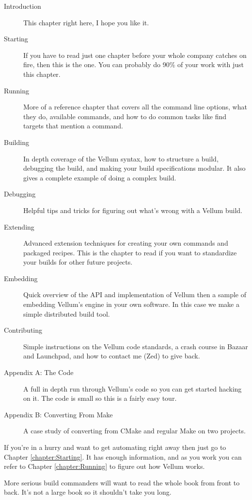 \begin{description}
\item [Introduction] This chapter right here, I hope you like it.
\item [Starting] If you have to read just one chapter before your whole
company catches on fire, then this is the one.  You can probably do 90\% of your
work with just this chapter.
\item [Running] More of a reference chapter that covers all the command line
options, what they do, available commands, and how to do common tasks like find
targets that mention a command.
\item [Building] In depth coverage of the Vellum syntax, how to structure a
build, debugging the build, and making your build specifications modular.  It
also gives a complete example of doing a complex build.
\item [Debugging] Helpful tips and tricks for figuring out what's wrong with a
Vellum build.
\item [Extending] Advanced extension techniques for creating your own commands
and packaged recipes.  This is the chapter to read if you want to standardize
your builds for other future projects.
\item [Embedding] Quick overview of the API and implementation of Vellum then a
sample of embedding Vellum's engine in your own software.  In this case we make
a simple distributed build tool.
\item [Contributing]  Simple instructions on the Vellum code standards, a crash
course in Bazaar and Launchpad, and how to contact me (Zed) to give back.
\item [Appendix A: The Code] A full in depth run through Vellum's code so you
can get started hacking on it.  The code is small so this is a fairly easy tour.
\item [Appendix B: Converting From Make] A case study of converting from CMake
and regular Make on two projects.
\end{description}

If you're in a hurry and want to get automating right away then just go to
Chapter \ref{chapter:Starting}.  It has enough information, and as you work you
can refer to Chapter \ref{chapter:Running} to figure out how Vellum works.

More serious build commanders will want to read the whole book from front to
back.  It's not a large book so it shouldn't take you long.

\tableofcontents
{}



